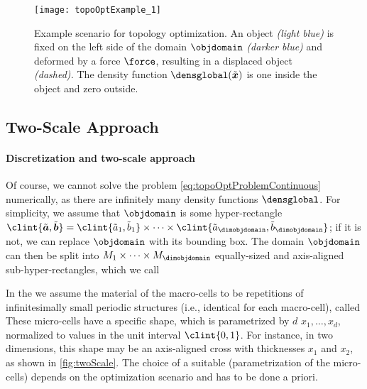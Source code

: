 \begin{SCfigure}
  \texttt{[image: topoOptExample\_1]}%
  \caption[%
    Example scenario for topology optimization%
  ]{%
    Example scenario for topology optimization.
    An object \emph{\textcolor{hellblau}{(light blue)}}
    is fixed on the left side
    of the domain $\objdomain$
    \emph{\textcolor{mittelblau!50}{(darker blue)}}
    and deformed by a force $\force$, resulting in a displaced object
    \emph{(dashed).}
    The density function $\densglobal(\tilde{\*x})$ is one inside the object
    and zero outside.%
  }%
  \label{fig:topoOptExample}%
\end{SCfigure}



\subsection{Two-Scale Approach}
\label{sec:612twoScale}

\paragraph{Discretization and two-scale approach}

Of course, we cannot solve the problem \eqref{eq:topoOptProblemContinuous}
numerically,
as there are infinitely many density functions $\densglobal$.
For simplicity, we assume that $\objdomain$ is some hyper-rectangle
$\clint{\tilde{\*a}, \tilde{\*b}}
= \clint{\tilde{a}_1, \tilde{b}_1} \times \dotsb \times
\clint{\tilde{a}_{\dimobjdomain}, \tilde{b}_{\dimobjdomain}}$;
if it is not, we can replace $\objdomain$ with its bounding box.
The domain $\objdomain$ can then be split into
$M_1 \times \dotsb \times M_{\dimobjdomain}$
equally-sized and axis-aligned sub-hyper-rectangles,
which we call 

In the 
we assume the material of the macro-cells to be
repetitions of infinitesimally small periodic structures
(i.e., identical for each macro-cell),
called 
These micro-cells have a specific shape, which is parametrized by
$d$  $x_1, \dotsc, x_d$,
normalized to values in the unit interval $\clint{0, 1}$.
For instance, in two dimensions,
this shape may be an axis-aligned cross
with thicknesses $x_1$ and $x_2$, as shown in \cref{fig:twoScale}.
The choice of a suitable 
(parametrization of the micro-cells)
depends on the optimization scenario and has to be done a priori.

